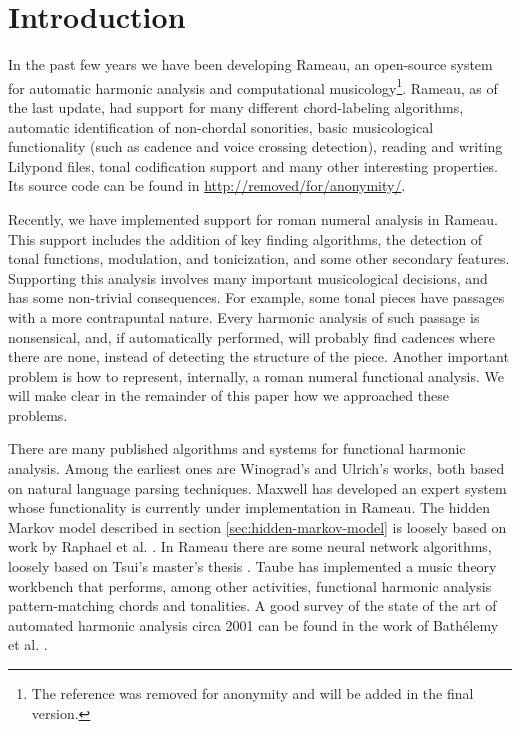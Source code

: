 
\section{Introduction}
\label{sec:introduction}

In the past few years we have been developing Rameau, an open-source
system for automatic harmonic analysis and computational
musicology\footnote{The reference was removed for anonymity and will
  be added in the final version.}. Rameau, as of the last update, had
support for many different chord-labeling algorithms, automatic
identification of non-chordal sonorities, basic musicological
functionality (such as cadence and voice crossing detection), reading
and writing Lilypond \cite{nienhuys.ea08:lilypond} files, tonal
codification support and many other interesting properties. Its source
code can be found in \url{http://removed/for/anonymity/}.

Recently, we have implemented support for roman numeral analysis in
Rameau. This support includes the addition of key finding algorithms,
the detection of tonal functions, modulation, and tonicization, and
some other secondary features. Supporting this analysis involves many
important musicological decisions, and has some non-trivial
consequences. For example, some tonal pieces have passages with a more
contrapuntal nature. Every harmonic analysis of such passage is
nonsensical, and, if automatically performed, will probably find
cadences where there are none, instead of detecting the structure of
the piece.  Another important problem is how to represent, internally,
a roman numeral functional analysis. We will make clear in the
remainder of this paper how we approached these problems.

There are many published algorithms and systems for functional
harmonic analysis. Among the earliest ones are Winograd's
\cite{winograd68:linguistics} and Ulrich's \cite{ulrich77:analysis}
works, both based on natural language parsing techniques. Maxwell
\cite{maxwell92:expert} has developed an expert system whose
functionality is currently under implementation in Rameau. The hidden
Markov model described in section \ref{sec:hidden-markov-model} is
loosely based on work by Raphael et
al. \cite{raphael.ea03:harmonic}. In Rameau there are some neural
network algorithms, loosely based on Tsui's master's thesis
\cite{tsui02:harmonic}. Taube \cite{taube99:automatic} has implemented
a music theory workbench that performs, among other activities,
functional harmonic analysis pattern-matching chords and tonalities. A
good survey of the state of the art of automated harmonic analysis
circa 2001 can be found in the work of Bathélemy et
al. \cite{barthelemy.ea01:figured}.

